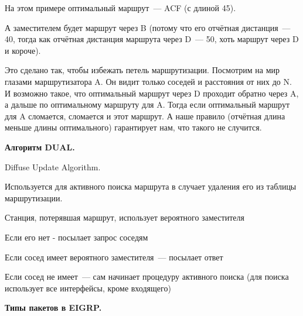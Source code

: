 На этом примере оптимальный маршрут~--- ACF (с длиной 45).

А заместителем будет маршрут через B (потому что его отчётная дистанция~--- 40, тогда как отчётная дистанция маршрута через D~--- 50, хоть маршрут через D и короче).

Это сделано так, чтобы избежать петель маршрутизации. Посмотрим на мир глазами маршрутизатора A. Он видит только соседей и расстояния от них до N. И возможно такое, что оптимальный маршрут через D проходит обратно через A, а дальше по оптимальному маршруту для A. Тогда если оптимальный маршрут для A сломается, сломается и этот маршрут. А наше правило (отчётная длина меньше длины оптимального) гарантирует нам, что такого не случится. 

{\bf Алгоритм DUAL.}

Diffuse Update Algorithm.

Используется для активного поиска маршрута в случает удаления его из таблицы маршрутизации.

\begin{MyItemize}
    \item Станция, потерявшая маршрут, использует вероятного заместителя
    \item Если его нет - посылает запрос соседям
    \item Если сосед имеет вероятного заместителя~--- посылает ответ
    \item Если сосед не имеет~--- сам начинает процедуру активного поиска (для поиска использует все интерфейсы, кроме входящего)
\end{MyItemize}

{\bf Типы пакетов в EIGRP.}

